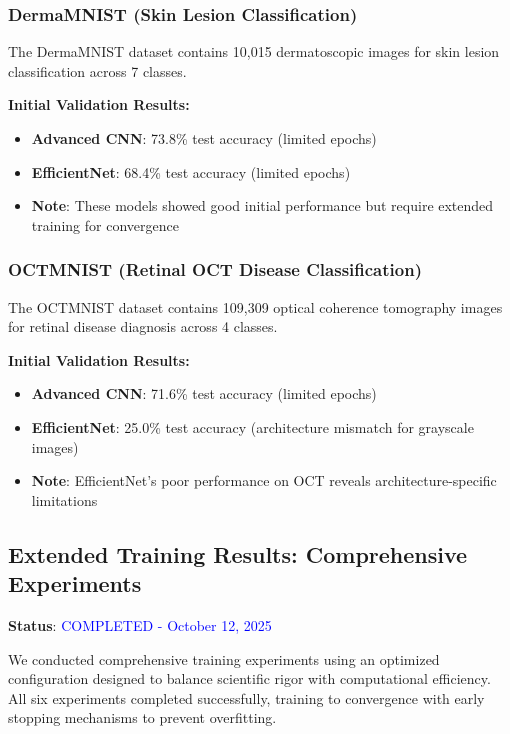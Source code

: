 \documentclass[12pt,a4paper]{article}
\begin{document}
\subsubsection{DermaMNIST (Skin Lesion Classification)}

The DermaMNIST dataset contains 10,015 dermatoscopic images for skin lesion classification across 7 classes.

\textbf{Initial Validation Results:}
\begin{itemize}
    \item \textbf{Advanced CNN}: 73.8\% test accuracy (limited epochs)
    \item \textbf{EfficientNet}: 68.4\% test accuracy (limited epochs)
    \item \textbf{Note}: These models showed good initial performance but require extended training for convergence
\end{itemize}

\subsubsection{OCTMNIST (Retinal OCT Disease Classification)}

The OCTMNIST dataset contains 109,309 optical coherence tomography images for retinal disease diagnosis across 4 classes.

\textbf{Initial Validation Results:}
\begin{itemize}
    \item \textbf{Advanced CNN}: 71.6\% test accuracy (limited epochs)
    \item \textbf{EfficientNet}: 25.0\% test accuracy (architecture mismatch for grayscale images)
    \item \textbf{Note}: EfficientNet's poor performance on OCT reveals architecture-specific limitations
\end{itemize}

\subsection{Extended Training Results: Comprehensive Experiments}

\textbf{Status}: \textcolor{blue}{COMPLETED - October 12, 2025}

We conducted comprehensive training experiments using an optimized configuration designed to balance scientific rigor with computational efficiency. All six experiments completed successfully, training to convergence with early stopping mechanisms to prevent overfitting.
\end{document}

